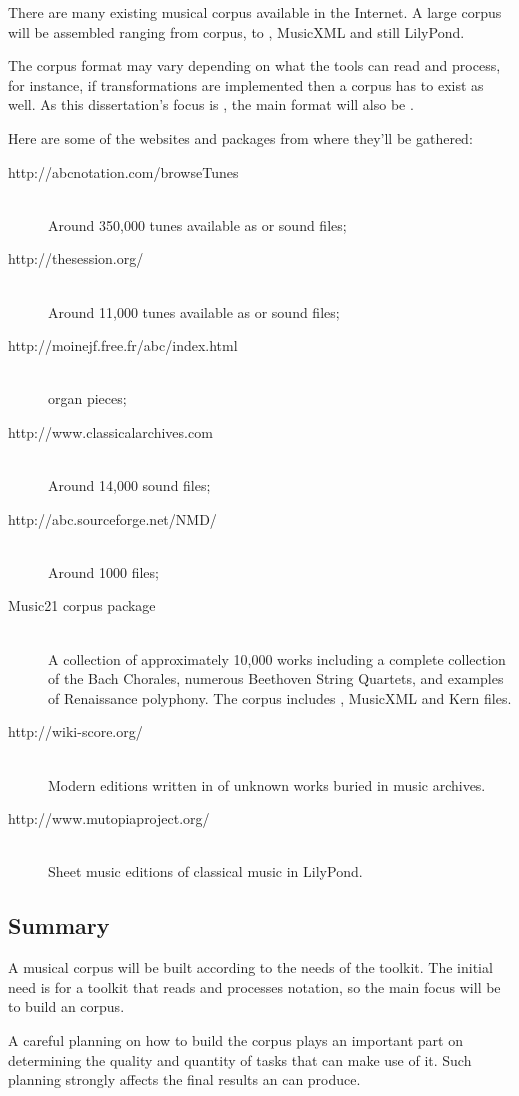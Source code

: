 There are many existing musical corpus available in the Internet. A large corpus will be assembled
ranging from \abc{} corpus, to \midi{}, MusicXML and still LilyPond. 

The corpus format may vary depending on what the tools can read and process, for instance, if
\midi{} transformations are implemented then a \midi{} corpus has to exist as well. As this
dissertation's focus is \abc{}, the main format will also be \abc{}.

Here are some of the websites and packages from where they'll be gathered:

\begin{description}
  \item[http://abcnotation.com/browseTunes] \hfill \\
    Around 350,000 tunes available as \abc{} or \midi{} sound files;
  \item[http://thesession.org/] \hfill \\
    Around 11,000 tunes available as \abc{} or \midi{} sound files;
  \item[http://moinejf.free.fr/abc/index.html] \hfill \\
    \abc{} organ pieces;
  \item[http://www.classicalarchives.com] \hfill \\
    Around 14,000 \midi{} sound files;
  \item[http://abc.sourceforge.net/NMD/] \hfill \\
    Around 1000 \abc{} files;
  \item[Music21 corpus package] \hfill \\
    A collection of approximately 10,000 works including a complete collection of the Bach Chorales,
    numerous Beethoven String Quartets, and examples of Renaissance polyphony. The corpus includes
    \abc{}, MusicXML and Kern files.
  \item[http://wiki-score.org/] \hfill \\
    Modern editions written in \abc{} of unknown works buried in music archives.
  \item[http://www.mutopiaproject.org/] \hfill \\
    Sheet music editions of classical music in LilyPond.
\end{description}

\subsection{Summary}

A musical corpus will be built according to the needs of the toolkit. The initial need is for a
toolkit that reads and processes \abc{} notation, so the main focus will be to build an \abc{}
corpus.

A careful planning on how to build the corpus plays an important part on determining the quality and
quantity of tasks that can make use of it. Such planning strongly affects the final results an
\abcpt{} can produce.
